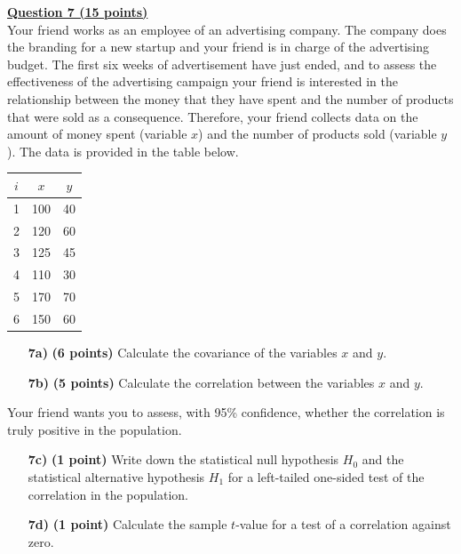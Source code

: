 \underline{\textbf{Question 7 (15 points)}} \\

Your friend works as an employee of an advertising company. The company does the branding for a new startup and your friend is in charge of the advertising budget. The first six weeks of advertisement have just ended, and to assess the effectiveness of the advertising campaign your friend is interested in the relationship between the money that they have spent and the number of products that were sold as a consequence. Therefore, your friend collects data on the amount of money spent (variable $x$) and the number of products sold (variable $y$). The data is provided in the table below. \\

\begin{center}
\begin{tabular}{c|c|c}
     $i$ & $x$ & $y$ \\
     \hline
     1 & 100 & 40 \\
     2 & 120 & 60 \\
     3 & 125 & 45 \\
     4 & 110 & 30 \\ 
     5 & 170 & 70 \\
     6 & 150 & 60
\end{tabular}
\end{center} 

\clearpage %

\begin{itemize}

    \item[\textbf{7a)}] \textbf{(6 points)} Calculate the covariance of the variables $x$ and $y$.
    
    \item[\textbf{7b)}] \textbf{(5 points)} Calculate the correlation between the variables $x$ and $y$.
    
\end{itemize}

Your friend wants you to assess, with 95\% confidence, whether the correlation is truly positive in the population.

\begin{itemize}
    
    \item[\textbf{7c)}] \textbf{(1 point)} Write down the statistical null hypothesis $H_0$ and the statistical alternative hypothesis $H_1$ for a left-tailed one-sided test of the correlation in the population.
    
    \item[\textbf{7d)}] \textbf{(1 point)} Calculate the sample $t$-value for a test of a correlation against zero.
    
\end{itemize}


